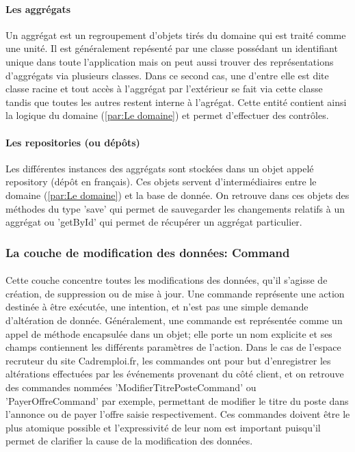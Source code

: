 \paragraph{Les aggrégats}
\label{par:Les aggrégats}
Un aggrégat est un regroupement d'objets tirés du domaine qui est traité comme une unité.
Il est généralement repésenté par une classe possédant un identifiant unique dans toute l'application mais on peut aussi trouver des représentations d'aggrégats via plusieurs classes.
Dans ce second cas, une d'entre elle est dite classe racine et tout accès à l'aggrégat par l'extérieur se fait via cette classe tandis que toutes les autres restent interne à l'agrégat.
Cette entité contient ainsi la logique du domaine (\ref{par:Le domaine}) et permet d'effectuer des contrôles.
\paragraph{Les repositories (ou dépôts)}
\label{par:Les repositories (ou dépôts)}
Les différentes instances des aggrégats sont stockées dans un objet appelé repository (dépôt en français).
Ces objets servent d'intermédiaires entre le domaine (\ref{par:Le domaine}) et la base de donnée.
On retrouve dans ces objets des méthodes du type 'save' qui permet de sauvegarder les changements relatifs à un aggrégat ou 'getById' qui permet de récupérer un aggrégat particulier.

\subsubsection{La couche de modification des données: Command}
\label{subs:La couche de modification des données: Command}
\paragraph{}
Cette couche concentre toutes les modifications des données, qu'il s'agisse de création, de suppression ou de mise à jour.
Une commande représente une action destinée à être exécutée, une intention, et n'est pas une simple demande d'altération de donnée.
Généralement, une commande est représentée comme un appel de méthode encapsulée dans un objet; elle porte un nom explicite et ses champs contiennent les différents paramètres de l'action.
Dans le cas de l'espace recruteur du site Cadremploi.fr, les commandes ont pour but d'enregistrer les altérations effectuées par les événements provenant du côté client, et on retrouve des commandes nommées 'ModifierTitrePosteCommand' ou 'PayerOffreCommand' par exemple, permettant de modifier le titre du poste dans l'annonce ou de payer l'offre saisie respectivement.
Ces commandes doivent être le plus atomique possible et l'expressivité de leur nom est important puisqu'il permet de clarifier la cause de la modification des données.
